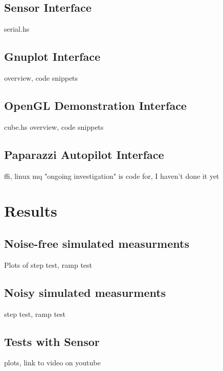 \documentclass[12pt]{report}
\begin{document}
\subsection{Sensor Interface}
serial.hs
\subsection{Gnuplot Interface}
overview, code snippets
\subsection{OpenGL Demonstration Interface}
cube.hs overview, code snippets 
\subsection{Paparazzi Autopilot Interface}
ffi, linux mq
"ongoing investigation" is code for, I haven't done it yet

\section{Results}
\subsection{Noise-free simulated measurments}
Plots of step test, ramp test
\subsection{Noisy simulated measurments}
step test, ramp test
\subsection{Tests with Sensor}
plots, link to video on youtube
\end{document}
